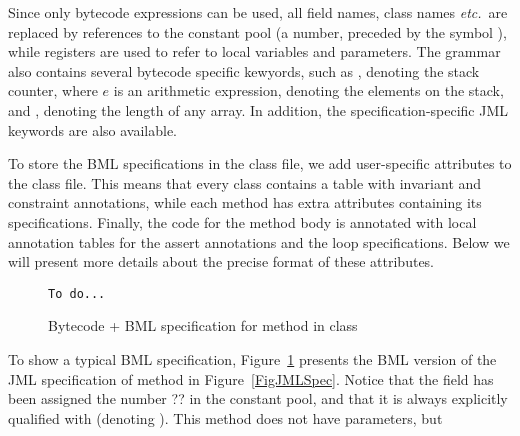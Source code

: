 Since only bytecode expressions can be used, all field names, class
names \emph{etc.}\ are replaced by references to the constant pool (a
number, preceded by the symbol \codeHook{\#}), while registers are
used to refer to local variables and parameters. The grammar also
contains several bytecode specific kewyords, such as ,
denoting the stack counter,  where \(e\) is an
arithmetic expression, denoting the elements on the stack, and
, denoting the length of any array. In
addition, the specification-specific JML keywords are also available.


To store the BML specifications in the class file, we add
user-specific attributes to the class file. This means that every
class contains a table with invariant and constraint annotations,
while each method has extra attributes containing its
specifications. Finally, the code for the method body is annotated
with local annotation tables for the assert annotations and the loop
specifications. Below we will present more details about the precise
format of these attributes.


\begin{figure}[t]
{\small
\begin{verbatim}
To do...
\end{verbatim}
}
\vspace*{-1em}\caption{Bytecode + BML specification for method  in class }\label{FigBMLSpec}
\end{figure}

To show a typical BML specification, Figure~\ref{FigBMLSpec} presents
the BML version of the JML specification of method
 in Figure~\ref{FigJMLSpec}. 
Notice that the
field  has been assigned the number ?? in the constant
pool, and that it is always explicitly qualified with 
(denoting ). This method does not have parameters, but 




